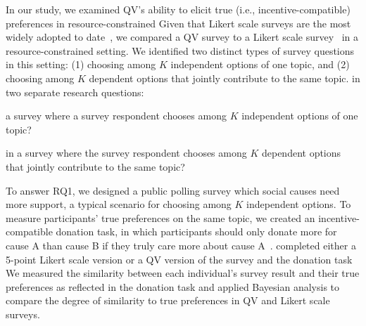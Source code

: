In our study, we examined QV's ability to elicit true (i.e., incentive-compatible) preferences in resource-constrained {} Given that Likert scale surveys are the most widely adopted to date~\cite{moors2016two}, we compared a QV survey to a Likert scale survey~\cite{likert1932technique} in a resource-constrained setting. We identified two distinct types of survey questions in this setting: (1) choosing among $K$ independent options of one topic, and (2) choosing among $K$ dependent options that jointly contribute to the same topic. {} in two separate research questions:

\begin{itemize}
    {} a survey where a survey respondent chooses among $K$ independent options of one topic? 
    
    {}

    {} in a survey where the survey respondent chooses among $K$ dependent options that jointly contribute to the same topic? 
\end{itemize}

To answer RQ1, we designed a public polling survey{} which social causes need more support, a typical scenario for choosing among $K$ independent options. To measure participants' true preferences on the same topic, we created an incentive-compatible donation task, in which participants should only donate more for cause A than cause B if they truly care more about cause A~\cite{champ1997using}. {} completed either a 5-point Likert scale version or a QV version of the survey and the donation task {} We measured the similarity between each individual's survey result and their true preferences as reflected in the donation task and applied Bayesian analysis to compare the degree of similarity to true preferences in QV and Likert scale surveys.

